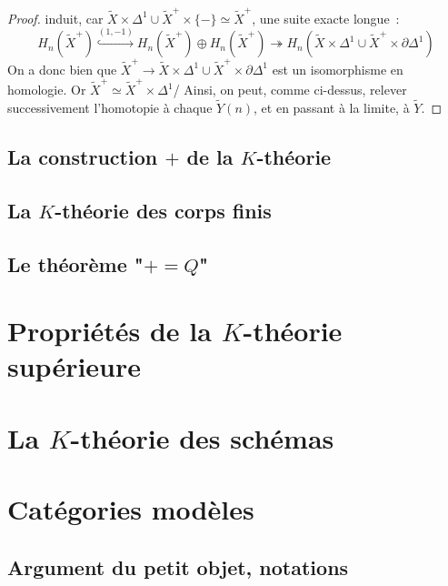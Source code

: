 \documentclass{amsart}
\theoremstyle{plain}
\theoremstyle{definition}
\theoremstyle{remark}
\newcommand{\ra}{\rightarrow}
\begin{document}
\begin{proof}
  induit, car $\tilde{X}\times \Delta^1\cup\tilde{X}^+\times \{-\}\simeq \tilde{X}^+$, une suite exacte longue~:
  $$H_n(\tilde{X}^+)\overset{(1,-1)}{\hookrightarrow}H_n(\tilde{X}^+)\oplus H_n(\tilde{X}^+)\twoheadrightarrow%
    H_n(\tilde{X}\times\Delta^1\cup\tilde{X}^+\times\partial\Delta^1)$$
  On a donc bien que $\tilde{X}^+\ra \tilde{X}\times\Delta^1\cup\tilde{X}^+\times\partial\Delta^1$ est un isomorphisme en homologie.
  Or $\tilde{X}^+\simeq \tilde{X}^+\times\Delta^1$/
  Ainsi, on peut, comme ci-dessus, relever successivement l'homotopie à
  chaque $\tilde{Y}(n)$, et en passant à la limite, à $\tilde{Y}$.
\end{proof}

\subsection{\texorpdfstring{La construction $+$ de la $K$-théorie}{La construction + de la K-théorie}}

\subsection{\texorpdfstring{La $K$-théorie des corps finis}{La K-théorie des corps finis}}

\subsection{\texorpdfstring{Le théorème "$+=Q$"}{Le théorème "+=Q"}}

\section{\texorpdfstring{Propriétés de la $K$-théorie supérieure}{Propriétés de la K-théorie supérieure}}

\section{\texorpdfstring{La $K$-théorie des schémas}{La K-théorie des schémas}}

\appendix

\section{Catégories modèles}

\subsection{Argument du petit objet, notations}
\end{document}
